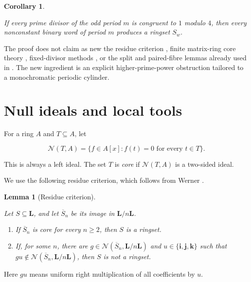 \documentclass[11pt]{article}
\newtheorem{lemma}[theorem]{Lemma}
\newtheorem{corollary}[theorem]{Corollary}
\numberwithin{equation}{section}
\begin{document}
\begin{corollary}
\label{cor:split-only}

If every prime divisor of the odd period $m$ is congruent to $1$ modulo $4$,
then every nonconstant binary word of period $m$ produces a ringset $S_w$.

\end{corollary}

The proof does not claim as new the residue criterion \cite{frisch2018,werner2026}, finite
matrix-ring core theory \cite{werner2022,rissnerwerner2025}, fixed-divisor methods \cite{peruginelli2014}, or the split and
paired-fibre lemmas already used in \cite{carptopus2026}. The new ingredient is an explicit
higher-prime-power obstruction tailored to a monochromatic periodic
cylinder.

\section{Null ideals and local tools}


For a ring $A$ and $T\subseteq A$, let

\[
\mathcal N(T,A)=\{f\in A[x]:f(t)=0\text{ for every }t\in T\}.
\]

This is always a left ideal. The set $T$ is \emph{core} if
$\mathcal N(T,A)$ is a two-sided ideal.

We use the following residue criterion, which follows from Werner
\cite[Lemmas 5.3 and 5.4]{werner2026}.

\begin{lemma}[Residue criterion]
\label{lem:residue}

Let $S\subseteq\mathbf L$, and let $\overline S_n$ be its image in
$\mathbf L/n\mathbf L$.

\begin{enumerate}
\item If $\overline S_n$ is core for every $n\ge2$, then $S$ is a ringset.
\item If, for some $n$, there are
$g\in\mathcal N(\overline S_n,\mathbf L/n\mathbf L)$ and
$u\in\{\mathbf i,\mathbf j,\mathbf k\}$ such that
$gu\notin\mathcal N(\overline S_n,\mathbf L/n\mathbf L)$, then $S$
is not a ringset.

\end{enumerate}

\end{lemma}

Here $gu$ means uniform right multiplication of all coefficients by $u$.
\end{document}
